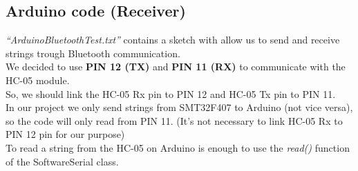 \subsection{Arduino code (Receiver)}
\textit{“ArduinoBluetoothTest.txt”} contains a sketch with allow us to send and receive strings trough Bluetooth communication.\\
We decided to use \textbf{PIN 12 (TX)} and \textbf{PIN 11 (RX)} to communicate with the HC-05 module.\\
So, we should link the HC-05 Rx pin to PIN 12 and HC-05 Tx pin to PIN 11.\\
In our project we only send strings from SMT32F407 to Arduino (not vice versa), so the code will only read from PIN 11. (It’s not necessary to link HC-05 Rx to PIN 12 pin for our purpose)\\
To read a string from the HC-05 on Arduino is enough to use the \textit{read()} function of the SoftwareSerial class.\\